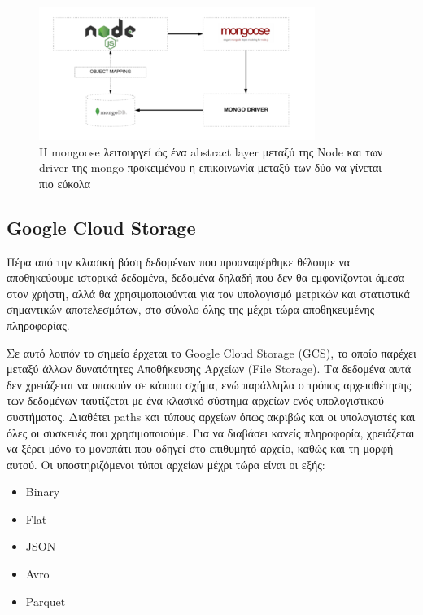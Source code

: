 \begin{figure}[!ht]
	\centering
	\includegraphics[width=0.8\textwidth]{./images/chapter2/mongoose.png}
	\caption[Mongoose, ένα abstract layer μεταξύ Node και mongo]
	{H mongoose λειτουργεί ώς ένα abstract layer μεταξύ της Node και των driver της mongo προκειμένου η επικοινωνία μεταξύ των δύο να γίνεται πιο εύκολα}
	\label{fig:mongoose}
\end{figure}

\break

\subsection{Google Cloud Storage}
\label{subsec:gcloud}

Πέρα από την κλασική βάση δεδομένων που προαναφέρθηκε θέλουμε να αποθηκεύουμε ιστορικά δεδομένα,
δεδομένα δηλαδή που δεν θα εμφανίζονται άμεσα στον χρήστη, αλλά θα χρησιμοποιούνται για τον υπολογισμό μετρικών και στατιστικά σημαντικών αποτελεσμάτων,
στο σύνολο όλης της μέχρι τώρα αποθηκευμένης πληροφορίας.

Σε αυτό λοιπόν το σημείο έρχεται το Google Cloud Storage (GCS), το οποίο παρέχει μεταξύ άλλων δυνατότητες
Αποθήκευσης Αρχείων (File Storage). Τα δεδομένα αυτά δεν χρειάζεται να υπακούν σε κάποιο σχήμα,
ενώ παράλληλα ο τρόπος αρχειοθέτησης των δεδομένων ταυτίζεται με ένα κλασικό σύστημα αρχείων
ενός υπολογιστικού συστήματος. Διαθέτει paths και τύπους αρχείων όπως ακριβώς και οι υπολογιστές και όλες οι
συσκευές που χρησιμοποιούμε. Για να διαβάσει κανείς πληροφορία, χρειάζεται να ξέρει μόνο το μονοπάτι που οδηγεί
στο επιθυμητό αρχείο, καθώς και τη μορφή αυτού. Οι υποστηριζόμενοι τύποι αρχείων μέχρι τώρα είναι οι εξής:

\begin{itemize}
	\item Binary
	\item Flat
	\item JSON
	\item Avro
	\item Parquet
\end{itemize}

